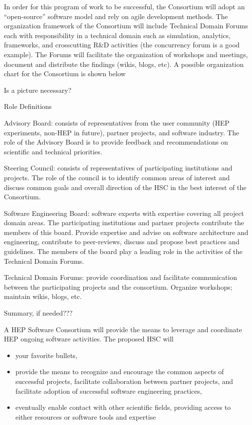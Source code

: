 \documentclass[12pt,letterpaper,fleqn]{article}
\begin{document}
In order for this program of work to be successful, the Consortium
will adopt an “open-source” software model and rely on agile
development methods.  The organization framework of the Consortium
will include Technical Domain Forums each with responsibility in a
technical domain such as simulation, analytics, frameworks, and
crosscutting R\&D activities (the concurrency forum is a good example).
The Forums will facilitate the organization of workshops and meetings,
document and distribute the findings (wikis, blogs, etc).   A
possible organization chart for the Consortium is shown below

Is a picture necessary?

Role Definitions

Advisory Board: consists of representatives from the user community
(HEP experiments, non-HEP in future), partner projects, and software
industry.  The role of the Advisory Board is to provide feedback
and recommendations on scientific and technical priorities.

Steering Council: consists of representatives of participating
institutions and projects.  The role of the council is to identify
common areas of interest and discuss common goals and overall
direction of the HSC in the best interest of the Consortium.

Software Engineering Board: software experts with expertise covering
all project domain areas. The participating institutions and partner
projects contribute the members of this board.  Provide expertise
and advise on software architecture and engineering, contribute to
peer-reviews, discuss and propose best practices and guidelines.
The members of the board play a leading role in the activities of
the Technical Domain Forums.

Technical Domain Forums: provide coordination and facilitate
communication between the participating projects and the consortium.
Organize workshops; maintain wikis, blogs, etc.


Summary, if needed???

A HEP Software Consortium will provide the means to leverage and coordinate HEP ongoing software activities.  The proposed HSC will
\begin{itemize}
\item your favorite bullets,
\item provide the means to recognize and encourage the common aspects of successful projects, facilitate collaboration between partner projects, and facilitate adoption of successful software engineering practices,
\item eventually enable contact with other scientific fields, providing access to either resources or software tools and expertise
\end{itemize}



\newpage

%
%
\end{document}
